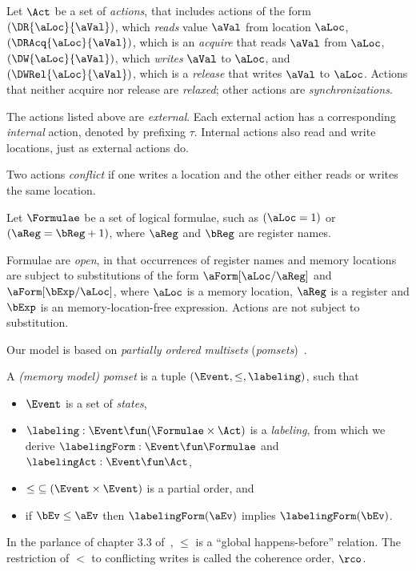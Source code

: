 Let $\Act$ be a set of \emph{actions}, that includes actions of the form
$(\DR{\aLoc}{\aVal})$, which \emph{reads} value $\aVal$ from location
$\aLoc$, $(\DRAcq{\aLoc}{\aVal})$, which is an \emph{acquire} that reads
$\aVal$ from $\aLoc$, $(\DW{\aLoc}{\aVal})$, which \emph{writes} $\aVal$ to
$\aLoc$, and $(\DWRel{\aLoc}{\aVal})$, which is a \emph{release} that writes
$\aVal$ to $\aLoc$. %
Actions that neither acquire nor release are \emph{relaxed}; other actions
are \emph{synchronizations}.

The actions listed above are \emph{external}.  Each external action has a
corresponding \emph{internal} action, denoted by prefixing $\tau$.  Internal
actions also read and write locations, just as external actions do.

Two actions \emph{conflict} if one writes a location and the other
either reads or writes the same location.

Let $\Formulae$ be a set of logical formulae, such as $(\aLoc=1)$ or
$(\aReg=\bReg+1)$, where $\aReg$ and $\bReg$ are register names.

Formulae are \emph{open}, in that occurrences of register names and memory
locations are subject to substitutions of the form $\aForm[\aLoc/\aReg]$ and
$\aForm[\bExp/\aLoc]$, where $\aLoc$ is a memory location, $\aReg$ is a
register and $\bExp$ is an memory-location-free expression.  Actions are not
subject to substitution.

Our model is based on \emph{partially ordered multisets} (\emph{pomsets})~\cite{GISCHER1988199}.
\begin{definition}
  \label{def:mmpomset}
  A \emph{(memory model) pomset} is a tuple
  $(\Event, {\le}, %
  \labeling)$, such that
  \begin{itemize}
  \item $\Event$ is a set of \emph{states},
  \item $\labeling: \Event \fun (\Formulae\times\Act)$ is a \emph{labeling},
    from which we derive $\labelingForm:\Event\fun\Formulae$ and $\labelingAct:\Event\fun\Act$,
  \item ${\le} \subseteq (\Event\times\Event)$ is a partial order, and
  \item if $\bEv\le\aEv$ then $\labelingForm(\aEv)$ implies
    $\labelingForm(\bEv)$.
  \end{itemize}
\end{definition}
In the parlance of chapter 3.3 of~\citet{AlglaveThesis}, $\le$ is a ``global
happens-before'' relation.  The restriction of $\lt$ to conflicting writes is
called the coherence order, $\rco$.  

